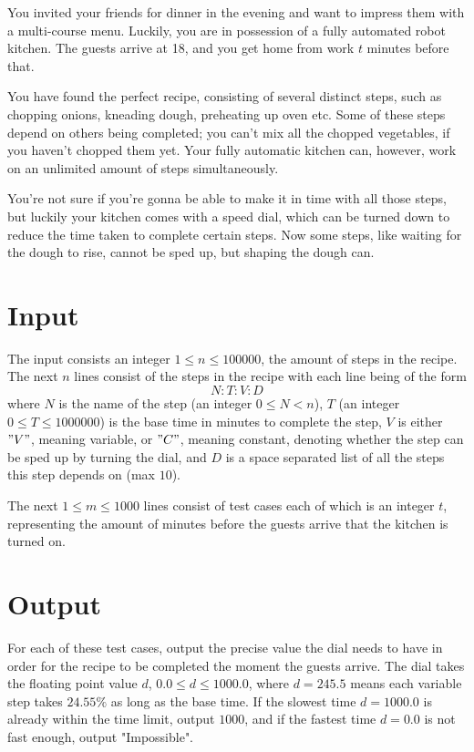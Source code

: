 
You invited your friends for dinner in the evening and want to impress them with a multi-course menu. Luckily, you are in possession of a fully automated robot kitchen. The guests arrive at 18, and you get home from work $t$ minutes before that. 

You have found the perfect recipe, consisting of several distinct steps, such as chopping onions, kneading dough, preheating up oven etc. Some of these steps depend on others being completed; you can't mix all the chopped vegetables, if you haven't chopped them yet. Your fully automatic kitchen can, however, work on an unlimited amount of steps simultaneously.

You're not sure if you're gonna be able to make it in time with all those steps, but luckily your kitchen comes with a speed dial, which can be turned down to reduce the time taken to complete certain steps. Now some steps, like waiting for the dough to rise, cannot be sped up, but shaping the dough can.


\section*{Input}

The input consists an integer $1 \leq n \leq 100000$, the amount of steps in the recipe. The next $n$ lines consist of the steps in the recipe with each line being of the form 
$$
N:T:V:D
$$
where $N$ is the name of the step (an integer $0 \leq N < n$), $T$ (an integer $0 \leq T \leq 1000000$) is the base time in minutes to complete the step, $V$ is either $"V"$, meaning variable, or $"C"$, meaning constant, denoting whether the step can be sped up by turning the dial, and $D$ is a space separated list of all the steps this step depends on (max $10$).

The next $1 \leq m \leq 1000$ lines consist of test cases each of which is an integer $t$, representing the amount of minutes before the guests arrive that the kitchen is turned on. 


\section*{Output}

For each of these test cases, output the precise value the dial needs to have in order for the recipe to be completed the moment the guests arrive. The dial takes the floating point value $d$, $0.0 \leq d \leq 1000.0$, where $d=245.5$ means each variable step takes $24.55\%$ as long as the base time. If the slowest time $d = 1000.0$ is already within the time limit, output $1000$, and if the fastest time $d = 0.0$ is not fast enough, output "Impossible".